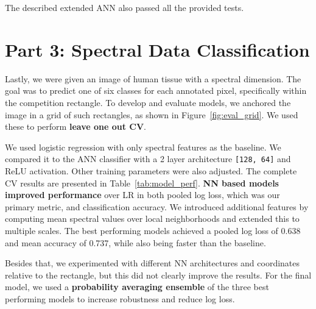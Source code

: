 \documentclass[fleqn,moreauthors,10pt]{ds_report}
\begin{document}
The described extended ANN also passed all the provided tests.

\section*{Part 3: Spectral Data Classification}

Lastly, we were given an image of human tissue with a spectral dimension. The goal was to predict one of six classes for each annotated pixel, specifically within the competition rectangle. To develop and evaluate models, we anchored the image in a grid of such rectangles, as shown in Figure~\ref{fig:eval_grid}. We used these to perform \textbf{leave one out CV}.

We used logistic regression with only spectral features as the baseline. We compared it to the ANN classifier with a 2 layer architecture \texttt{[128, 64]} and ReLU activation. Other training parameters were also adjusted. The complete CV results are presented in Table~\ref{tab:model_perf}. \textbf{NN based models improved performance} over LR in both pooled log loss, which was our primary metric, and classification accuracy. We introduced additional features by computing mean spectral values over local neighborhoods and extended this to multiple scales. The best performing models achieved a pooled log loss of 0.638 and mean accuracy of 0.737, while also being faster than the baseline.

Besides that, we experimented with different NN architectures and coordinates relative to the rectangle, but this did not clearly improve the results. For the final model, we used a \textbf{probability averaging ensemble} of the three best performing models to increase robustness and reduce log loss.



\end{document}
